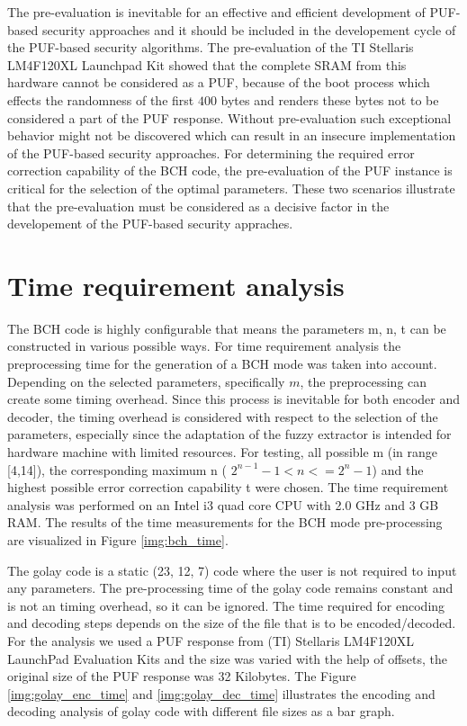 The pre-evaluation is inevitable for an effective and efficient development of PUF-based security approaches and it should be included in the developement cycle of the PUF-based security algorithms. The pre-evaluation of the TI Stellaris LM4F120XL Launchpad Kit showed that the complete SRAM from this hardware cannot be considered as a PUF, because of the boot process which effects the randomness of the first  $400$ bytes and renders these bytes not to be considered a part of the PUF response.
Without pre-evaluation such exceptional behavior might not be discovered which can result in an insecure implementation of the PUF-based security approaches. For determining the required error correction capability of the BCH code, the pre-evaluation of the PUF instance is critical for the selection of the optimal parameters. These two scenarios illustrate that the pre-evaluation must be considered as a decisive factor in the developement of the PUF-based security appraches.


\section{Time requirement analysis}

The BCH code is highly configurable that means the parameters m, n, t can be constructed in various possible ways. For time requirement analysis the preprocessing time for the generation of a BCH mode was taken into account. Depending on the selected parameters, specifically $m$, the preprocessing can create some timing overhead. Since this process is inevitable for both encoder and decoder, the timing overhead is considered with respect to the selection of the parameters, especially since
the adaptation of the fuzzy extractor is intended for hardware machine with limited resources. For testing, all possible m (in range [4,14]), the corresponding maximum n ( $2^{n-1} - 1 < n <= 2^{n} - 1$) and the highest possible error correction capability t were chosen. The time requirement analysis was performed on an Intel i3 quad core CPU with 2.0 GHz and 3 GB RAM. The results of the time measurements for the BCH mode pre-processing are visualized in Figure \ref{img:bch_time}.

The golay code is a static (23, 12, 7) code where the user is not required to input any parameters. The pre-processing time of the golay code remains constant and is not an timing overhead, so it can be ignored. The time required for encoding and decoding steps depends on the size of the file that is to be encoded/decoded. For the analysis we used a PUF response from (TI) Stellaris LM4F120XL LaunchPad Evaluation Kits and the size was varied with the help of offsets, the original size of
the PUF response was 32 Kilobytes. The Figure \ref{img:golay_enc_time} and \ref{img:golay_dec_time} illustrates the encoding and decoding analysis of golay code with different file sizes as a bar graph.\\

